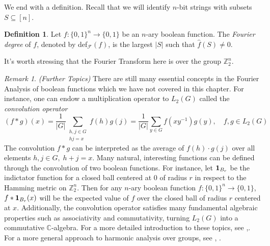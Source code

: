 \documentclass{amsart}
\theoremstyle{definition}
\newtheorem{definition}[theorem]{Definition}
\theoremstyle{remark}
\newtheorem{remark}[theorem]{Remark}
\numberwithin{equation}{section}
\theoremstyle{remark}
\begin{document}
\noindent We end with a definition. Recall that we will identify $n$-bit strings with subsets $S \subseteq [n]$.
%
\begin{definition}
  Let $f:\{0,1\}^n \rightarrow \{0,1\}$ be an $n$-ary boolean function. The \emph{Fourier degree} of $f$, denoted by def$_{\mathcal{F}}(f)$, is the largest $|S|$ such that $\hat{f}(S) \neq 0$.
\end{definition}
%
\noindent It's worth stressing that the Fourier Transform here is over the group $\mathbb{Z}_2^n$.

\begin{remark}{\emph{(Further Topics)}}
  There are still many essential concepts in the Fourier Analysis of boolean functions which we have not covered in this chapter. For instance, one can endow a multiplication operator to $L_2(G)$ called the \emph{convolution operator}
  $$ (f * g)(x) = \frac{1}{|G|}\sum_{\substack{h,j \in G \\ hj = x}} f(h)g(j) = \frac{1}{|G|}\sum_{y \in G} f(xy^{-1})g(y), \quad f,g \in L_2(G)$$
   The convolution $f * g$ can be interpreted as the average of $f(h)\cdot g(j)$ over all elements $h,j \in G, \; h + j = x$. Many natural, interesting functions can be defined through the convolution of two boolean functions. For instance, let ${\bf 1}_{B_r}$ be the indictator function for a closed ball centered at $0$ of radius $r$ in respect to the Hamming metric on $\mathbb{Z}_2^n$. Then for any $n$-ary boolean function $f:\{0,1\}^n \rightarrow \{0,1\}$, $f * {\bf 1}_{B_r}(x)$ will be the expected value of $f$ over the closed ball of radius $r$ centered at $x$. Additionally, the convolution operator satisfies many fundamental algebraic properties such as associativity and commutativity, turning $L_2(G)$ into a commutative $\mathbb{C}$-algebra.
   For a more detailed introduction to these topics, see \cite{hatami},\cite{odonnell}. For a more general approach to harmonic analysis over groups, see \cite{rudin}, \cite{ceccherini}.
\end{remark}
\end{document}
